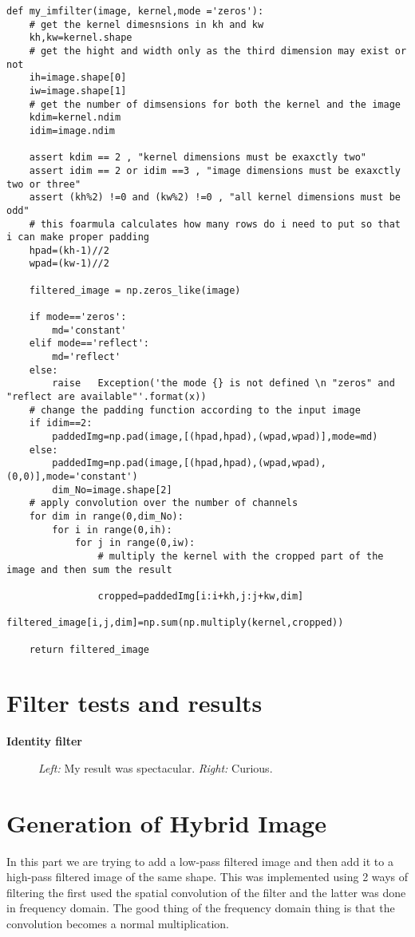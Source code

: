\begin{lstlisting}
def my_imfilter(image, kernel,mode ='zeros'):
	# get the kernel dimesnsions in kh and kw
	kh,kw=kernel.shape
	# get the hight and width only as the third dimension may exist or not
	ih=image.shape[0]
	iw=image.shape[1]
	# get the number of dimsensions for both the kernel and the image
	kdim=kernel.ndim
	idim=image.ndim
	
	assert kdim == 2 , "kernel dimensions must be exaxctly two"
	assert idim == 2 or idim ==3 , "image dimensions must be exaxctly two or three"
	assert (kh%2) !=0 and (kw%2) !=0 , "all kernel dimensions must be odd"
	# this foarmula calculates how many rows do i need to put so that i can make proper padding
	hpad=(kh-1)//2
	wpad=(kw-1)//2
	
	filtered_image = np.zeros_like(image)
	
	if mode=='zeros':
		md='constant'
	elif mode=='reflect':
		md='reflect'
	else:
		raise   Exception('the mode {} is not defined \n "zeros" and "reflect are available"'.format(x))
	# change the padding function according to the input image
	if idim==2:
		paddedImg=np.pad(image,[(hpad,hpad),(wpad,wpad)],mode=md)
	else:
		paddedImg=np.pad(image,[(hpad,hpad),(wpad,wpad),(0,0)],mode='constant')
		dim_No=image.shape[2]
	# apply convolution over the number of channels
	for dim in range(0,dim_No):
		for i in range(0,ih):
			for j in range(0,iw):
				# multiply the kernel with the cropped part of the image and then sum the result
				
				cropped=paddedImg[i:i+kh,j:j+kw,dim]
				filtered_image[i,j,dim]=np.sum(np.multiply(kernel,cropped))
	
	return filtered_image

\end{lstlisting}

\section*{Filter tests and results}

{\Large \textbf{Identity filter}}

\begin{figure}[h]
    \centering
    \caption{\emph{Left:} My result was spectacular. \emph{Right:} Curious.}
    \label{fig:result1}
\end{figure}




\newpage
\section*{Generation of Hybrid Image}
In this part we are trying to add a low-pass filtered image and then add it to a high-pass filtered image of the same shape. This was implemented using 2 ways of filtering the first used the spatial convolution of the filter and the latter was done in frequency domain. The good thing of the frequency domain thing is that the convolution becomes a normal multiplication. 

